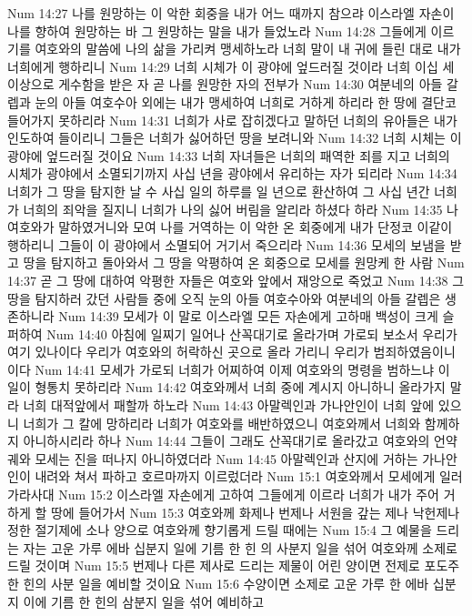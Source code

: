 Num 14:27  나를 원망하는 이 악한 회중을 내가 어느 때까지 참으랴 이스라엘 자손이 나를 향하여 원망하는 바 그 원망하는 말을 내가 들었노라
Num 14:28  그들에게 이르기를 여호와의 말씀에 나의 삶을 가리켜 맹세하노라 너희 말이 내 귀에 들린 대로 내가 너희에게 행하리니
Num 14:29  너희 시체가 이 광야에 엎드러질 것이라 너희 이십 세 이상으로 게수함을 받은 자 곧 나를 원망한 자의 전부가
Num 14:30  여분네의 아들 갈렙과 눈의 아들 여호수아 외에는 내가 맹세하여 너희로 거하게 하리라 한 땅에 결단코 들어가지 못하리라
Num 14:31  너희가 사로 잡히겠다고 말하던 너희의 유아들은 내가 인도하여 들이리니 그들은 너희가 싫어하던 땅을 보려니와
Num 14:32  너희 시체는 이 광야에 엎드러질 것이요
Num 14:33  너희 자녀들은 너희의 패역한 죄를 지고 너희의 시체가 광야에서 소멸되기까지 사십 년을 광야에서 유리하는 자가 되리라
Num 14:34  너희가 그 땅을 탐지한 날 수 사십 일의 하루를 일 년으로 환산하여 그 사십 년간 너희가 너희의 죄악을 질지니 너희가 나의 싫어 버림을 알리라 하셨다 하라
Num 14:35  나 여호와가 말하였거니와 모여 나를 거역하는 이 악한 온 회중에게 내가 단정코 이같이 행하리니 그들이 이 광야에서 소멸되어 거기서 죽으리라
Num 14:36  모세의 보냄을 받고 땅을 탐지하고 돌아와서 그 땅을 악평하여 온 회중으로 모세를 원망케 한 사람
Num 14:37  곧 그 땅에 대하여 악평한 자들은 여호와 앞에서 재앙으로 죽었고
Num 14:38  그 땅을 탐지하러 갔던 사람들 중에 오직 눈의 아들 여호수아와 여분네의 아들 갈렙은 생존하니라
Num 14:39  모세가 이 말로 이스라엘 모든 자손에게 고하매 백성이 크게 슬퍼하여
Num 14:40  아침에 일찌기 일어나 산꼭대기로 올라가며 가로되 보소서 우리가 여기 있나이다 우리가 여호와의 허락하신 곳으로 올라 가리니 우리가 범죄하였음이니이다
Num 14:41  모세가 가로되 너희가 어찌하여 이제 여호와의 명령을 범하느냐 이 일이 형통치 못하리라
Num 14:42  여호와께서 너희 중에 계시지 아니하니 올라가지 말라 너희 대적앞에서 패할까 하노라
Num 14:43  아말렉인과 가나안인이 너희 앞에 있으니 너희가 그 칼에 망하리라 너희가 여호와를 배반하였으니 여호와께서 너희와 함께하지 아니하시리라 하나
Num 14:44  그들이 그래도 산꼭대기로 올라갔고 여호와의 언약궤와 모세는 진을 떠나지 아니하였더라
Num 14:45  아말렉인과 산지에 거하는 가나안인이 내려와 쳐서 파하고 호르마까지 이르렀더라
Num 15:1  여호와께서 모세에게 일러 가라사대
Num 15:2  이스라엘 자손에게 고하여 그들에게 이르라 너희가 내가 주어 거하게 할 땅에 들어가서
Num 15:3  여호와께 화제나 번제나 서원을 갚는 제나 낙헌제나 정한 절기제에 소나 양으로 여호와께 향기롭게 드릴 때에는
Num 15:4  그 예물을 드리는 자는 고운 가루 에바 십분지 일에 기름 한 힌 의 사분지 일을 섞어 여호와께 소제로 드릴 것이며
Num 15:5  번제나 다른 제사로 드리는 제물이 어린 양이면 전제로 포도주 한 힌의 사분 일을 예비할 것이요
Num 15:6  수양이면 소제로 고운 가루 한 에바 십분지 이에 기름 한 힌의 삼분지 일을 섞어 예비하고
